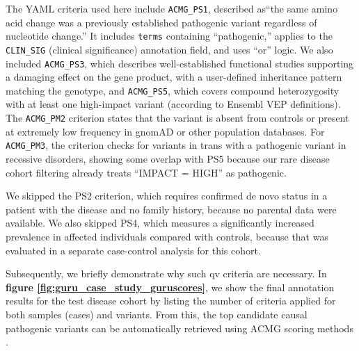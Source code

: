 The YAML criteria used here include \texttt{ACMG\_PS1}, described as``the same amino acid change was a previously established pathogenic variant regardless of nucleotide change.'' It includes \texttt{terms} containing ``pathogenic,'' applies to the \texttt{CLIN\_SIG} (clinical significance) annotation field, and uses ``or'' logic. We also included \texttt{ACMG\_PS3}, which describes well-established functional studies supporting a damaging effect on the gene product, with a user-defined inheritance pattern matching the genotype, and \texttt{ACMG\_PS5}, which covers compound heterozygosity with at least one high-impact variant (according to Ensembl VEP definitions). The \texttt{ACMG\_PM2} criterion states that the variant is absent from controls or present at extremely low frequency in gnomAD or other population databases. For \texttt{ACMG\_PM3}, the criterion checks for variants in trans with a pathogenic variant in recessive disorders, showing some overlap with PS5 because our rare disease cohort filtering already treats ``IMPACT = HIGH'' as pathogenic.

We skipped the PS2 criterion, which requires confirmed de novo status in a patient with the disease and no family history, because no parental data were available. We also skipped PS4, which measures a significantly increased prevalence in affected individuals compared with controls, because that was evaluated in a separate case-control analysis for this cohort.

Subsequently, we briefly demonstrate why such \ac{qv} criteria are necessary. In \textbf{figure \ref{fig:guru_case_study_guruscores}}, we show the final annotation results for the test disease cohort by listing the number of criteria applied for both samples (cases) and variants. From this, the top candidate causal pathogenic variants can be automatically retrieved using ACMG scoring methods \cite{richards2015standards, tavtigian2020fitting}.

